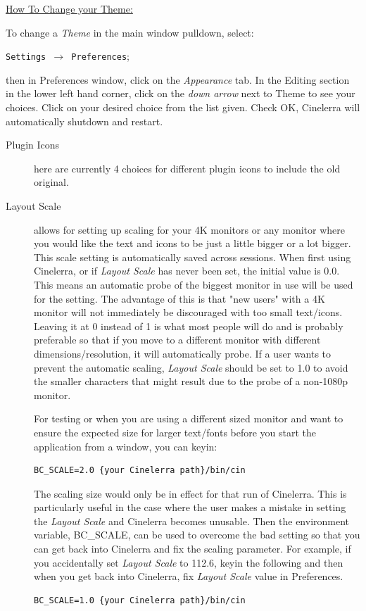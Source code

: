 \underline{How To Change your Theme:}

To change a \textit{Theme} in the main window pulldown, select:

\texttt{Settings $\rightarrow$ Preferences};

then in Preferences window, click on the \textit{Appearance} tab. In the Editing section in the lower left hand corner,	click on the \textit{down arrow} next to Theme to see your choices. Click on your desired choice from the list given. Check OK, Cinelerra will automatically shutdown and restart.

\begin{description}
    \item[Plugin Icons] here are currently 4 choices for different plugin icons to include the old original.
    \item[Layout Scale] allows for setting up scaling 
for your 4K monitors or any monitor where you would like the text and icons to be just a little bigger or a lot bigger. This scale setting is automatically saved across sessions. 
When first using Cinelerra, or if \textit{Layout Scale} has never been set, the initial value is 0.0.
This means an automatic probe of the biggest monitor in use will be used for the setting. The advantage of this is that "new users" with a 4K monitor will not immediately be discouraged with too small text/icons.
Leaving it at 0 instead of 1 is what most people will do and is probably preferable so that if you move to a different monitor with different dimensions/resolution, it will automatically probe. 
If a user wants to prevent the automatic scaling, \textit{Layout Scale} should be set to 1.0 to avoid the smaller characters that might result due to the probe of a non-1080p monitor.

For testing or when you are using a different sized monitor and want to ensure the expected
size for larger text/fonts before you start the application from a window, you can keyin:
\begin{lstlisting}[numbers=none]
        BC_SCALE=2.0 {your Cinelerra path}/bin/cin
\end{lstlisting}
The scaling size would only be in effect for that run of Cinelerra.  This is particularly
useful in the case where the user makes a mistake in setting the \textit{Layout Scale} and Cinelerra becomes unusable. 
Then the environment variable, BC\_SCALE, can be used to overcome the bad setting so that you can get back into
Cinelerra and fix the scaling parameter.  For example, if you 
accidentally set \textit{Layout Scale} to 112.6, keyin the following 
and then when you get back into Cinelerra, fix \textit{Layout Scale} value in Preferences.  
\begin{lstlisting}[numbers=none]
        BC_SCALE=1.0 {your Cinelerra path}/bin/cin
\end{lstlisting}


\end{description}
